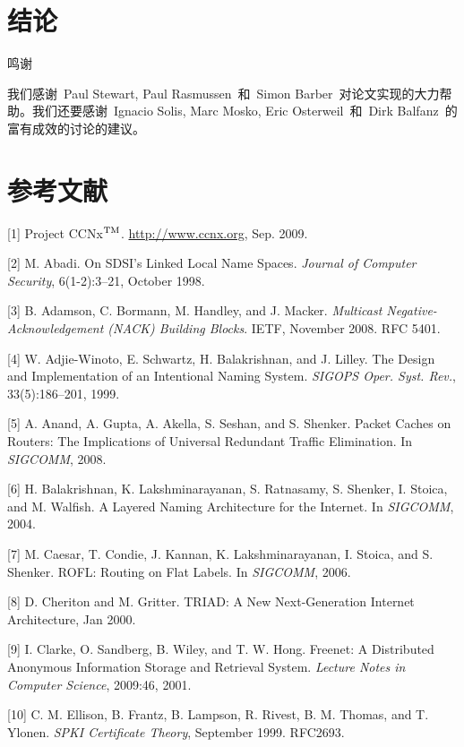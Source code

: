 \section{结论}
\label{sec:8}

\heiti
鸣谢

\songti
我们感谢~Paul Stewart, Paul Rasmussen~和~Simon Barber~对论文实现的大力帮助。我们还要感谢~Ignacio Solis, Marc Mosko, Eric Osterweil~和~Dirk Balfanz~的富有成效的讨论的建议。

\section{参考文献}
\def\tm{\leavevmode\hbox{$\rm {}^{TM}$}} %
[1] Project CCNx\tm. \url{http://www.ccnx.org}, Sep. 2009.

[2] M. Abadi. On SDSI’s Linked Local Name Spaces. \emph{Journal of Computer Security}, 6(1-2):3–21, October 1998.

[3] B. Adamson, C. Bormann, M. Handley, and J. Macker.
\emph{Multicast Negative-Acknowledgement (NACK) Building
Blocks}. IETF, November 2008. RFC 5401.

[4] W. Adjie-Winoto, E. Schwartz, H. Balakrishnan, and
J. Lilley. The Design and Implementation of an Intentional Naming System. \emph{SIGOPS Oper. Syst. Rev.}, 33(5):186–201, 1999.

[5] A. Anand, A. Gupta, A. Akella, S. Seshan, and S. Shenker. Packet Caches on Routers: The Implications of Universal Redundant Traffic Elimination. In \emph{SIGCOMM}, 2008.

[6] H. Balakrishnan, K. Lakshminarayanan, S. Ratnasamy, S. Shenker, I. Stoica, and M. Walfish. A Layered Naming Architecture for the Internet. In \emph{SIGCOMM}, 2004.

[7] M. Caesar, T. Condie, J. Kannan, K. Lakshminarayanan,
I. Stoica, and S. Shenker. ROFL: Routing on Flat Labels. In \emph{SIGCOMM}, 2006.

[8] D. Cheriton and M. Gritter. TRIAD: A New Next-Generation Internet Architecture, Jan 2000.

[9] I. Clarke, O. Sandberg, B. Wiley, and T. W. Hong. Freenet: A Distributed Anonymous Information Storage and Retrieval System. \emph{Lecture Notes in Computer Science}, 2009:46, 2001.

[10] C. M. Ellison, B. Frantz, B. Lampson, R. Rivest, B. M. Thomas, and T. Ylonen. \emph{SPKI Certificate Theory}, September 1999. RFC2693.


